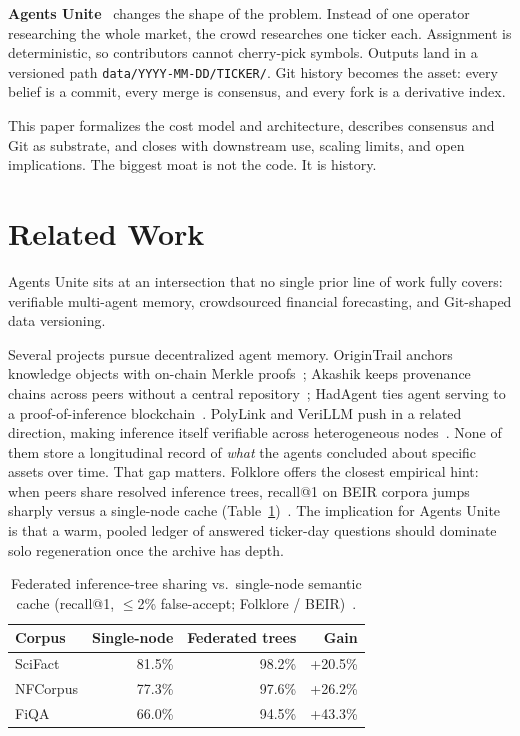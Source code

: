 \documentclass[10pt,twocolumn]{article}
\begin{document}
\textbf{Agents Unite}~\cite{agentsunite} changes the shape of the problem. Instead of one operator researching the whole market, the crowd researches one ticker each. Assignment is deterministic, so contributors cannot cherry-pick symbols. Outputs land in a versioned path \texttt{data/YYYY-MM-DD/TICKER/}. Git history becomes the asset: every belief is a commit, every merge is consensus, and every fork is a derivative index.

This paper formalizes the cost model and architecture, describes consensus and Git as substrate, and closes with downstream use, scaling limits, and open implications. The biggest moat is not the code. It is history.

\section{Related Work}

Agents Unite sits at an intersection that no single prior line of work fully covers: verifiable multi-agent memory, crowdsourced financial forecasting, and Git-shaped data versioning.

Several projects pursue decentralized agent memory. OriginTrail anchors knowledge objects with on-chain Merkle proofs~\cite{origintrail}; Akashik keeps provenance chains across peers without a central repository~\cite{akashik}; HadAgent ties agent serving to a proof-of-inference blockchain~\cite{hadagent}. PolyLink and VeriLLM push in a related direction, making inference itself verifiable across heterogeneous nodes~\cite{polylink,verillm}. None of them store a longitudinal record of \emph{what} the agents concluded about specific assets over time. That gap matters. Folklore offers the closest empirical hint: when peers share resolved inference trees, recall@1 on BEIR corpora jumps sharply versus a single-node cache (Table~\ref{tab:federation})~\cite{folklore2026}. The implication for Agents Unite is that a warm, pooled ledger of answered ticker-day questions should dominate solo regeneration once the archive has depth.

\begin{table}[h]
\centering
\caption{Federated inference-tree sharing vs.\ single-node semantic cache (recall@1, $\leq$2\% false-accept; Folklore / BEIR)~\cite{folklore2026}.}
\label{tab:federation}
\scriptsize
\begin{tabular}{@{}lrrr@{}}
\toprule
\textbf{Corpus} & \textbf{Single-node} & \textbf{Federated trees} & \textbf{Gain} \\
\midrule
SciFact & 81.5\% & 98.2\% & +20.5\% \\
NFCorpus & 77.3\% & 97.6\% & +26.2\% \\
FiQA & 66.0\% & 94.5\% & +43.3\% \\
\bottomrule
\end{tabular}
\end{table}
\end{document}
